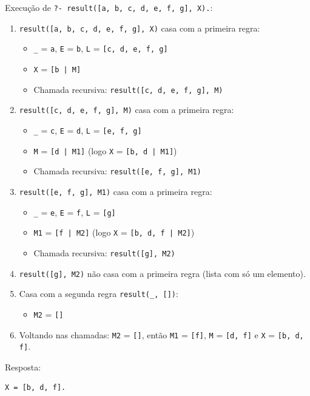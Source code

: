\documentclass{article}
\begin{document}
Execução de \texttt{?- result([a, b, c, d, e, f, g], X).}:
\begin{enumerate}
    \item \texttt{result([a, b, c, d, e, f, g], X)} casa com a primeira regra:
    \begin{itemize}
        \item \texttt{\_} = \texttt{a}, \texttt{E} = \texttt{b}, \texttt{L} = \texttt{[c, d, e, f, g]}
        \item \texttt{X} = \texttt{[b | M]}
        \item Chamada recursiva: \texttt{result([c, d, e, f, g], M)}
    \end{itemize}
    \item \texttt{result([c, d, e, f, g], M)} casa com a primeira regra:
    \begin{itemize}
        \item \texttt{\_} = \texttt{c}, \texttt{E} = \texttt{d}, \texttt{L} = \texttt{[e, f, g]}
        \item \texttt{M} = \texttt{[d | M1]} (logo \texttt{X} = \texttt{[b, d | M1]})
        \item Chamada recursiva: \texttt{result([e, f, g], M1)}
    \end{itemize}
    \item \texttt{result([e, f, g], M1)} casa com a primeira regra:
    \begin{itemize}
        \item \texttt{\_} = \texttt{e}, \texttt{E} = \texttt{f}, \texttt{L} = \texttt{[g]}
        \item \texttt{M1} = \texttt{[f | M2]} (logo \texttt{X} = \texttt{[b, d, f | M2]})
        \item Chamada recursiva: \texttt{result([g], M2)}
    \end{itemize}
    \item \texttt{result([g], M2)} não casa com a primeira regra (lista com só um elemento).
    \item Casa com a segunda regra \texttt{result(\_, [])}:
    \begin{itemize}
        \item \texttt{M2} = \texttt{[]}
    \end{itemize}
    \item Voltando nas chamadas: \texttt{M2} = \texttt{[]}, então \texttt{M1} = \texttt{[f]}, \texttt{M} = \texttt{[d, f]} e \texttt{X} = \texttt{[b, d, f]}.
\end{enumerate}
Resposta:
\begin{verbatim}
X = [b, d, f].
\end{verbatim}
\end{document}

